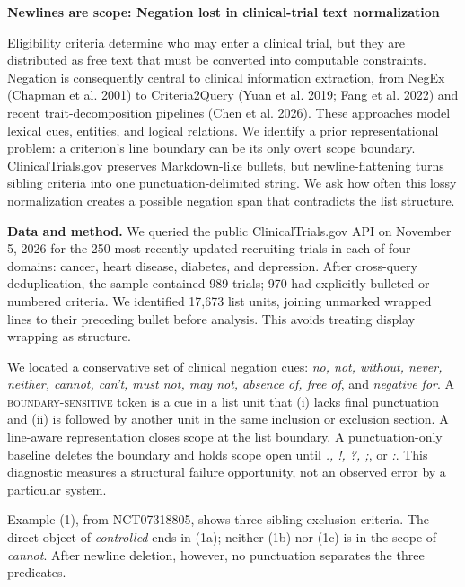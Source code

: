 \documentclass[12pt]{article}
\newcommand{\ex}[1]{\textit{#1}}
\begin{document}
\begin{center}
{\bfseries Newlines are scope: Negation lost in clinical-trial text normalization}
\end{center}
\vspace{-0.65em}

Eligibility criteria determine who may enter a clinical trial, but they are
distributed as free text that must be converted into computable constraints.
Negation is consequently central to clinical information extraction, from
NegEx (Chapman et al. 2001) to Criteria2Query (Yuan et al. 2019; Fang et al.
2022) and recent trait-decomposition pipelines (Chen et al. 2026). These
approaches model lexical cues, entities, and logical relations. We identify a
prior representational problem: a criterion's line boundary can be its only
overt scope boundary. ClinicalTrials.gov preserves Markdown-like bullets, but
newline-flattening turns sibling criteria into one punctuation-delimited
string. We ask how often this lossy normalization creates a possible negation
span that contradicts the list structure.

\textbf{Data and method.}
We queried the public ClinicalTrials.gov API on November 5, 2026 for the 250
most recently updated recruiting trials in each of four domains: cancer, heart
disease, diabetes, and depression. After cross-query deduplication, the sample
contained 989 trials; 970 had explicitly bulleted or numbered criteria. We
identified 17,673 list units, joining unmarked wrapped lines to their preceding
bullet before analysis. This avoids treating display wrapping as structure.

We located a conservative set of clinical negation cues: \ex{no, not,
without, never, neither, cannot, can't, must not, may not, absence of, free of},
and \ex{negative for}. A \textsc{boundary-sensitive} token is a cue in a list
unit that (i) lacks final punctuation and (ii) is followed by another unit in
the same inclusion or exclusion section. A line-aware representation closes
scope at the list boundary. A punctuation-only baseline deletes the boundary
and holds scope open until \ex{., !, ?, ;}, or \ex{:}. This diagnostic measures
a structural failure opportunity, not an observed error by a particular
system.

Example (1), from NCT07318805, shows three sibling exclusion criteria. The
direct object of \ex{controlled} ends in (1a); neither (1b) nor (1c) is in the
scope of \ex{cannot}. After newline deletion, however, no punctuation separates
the three predicates.
\end{document}

